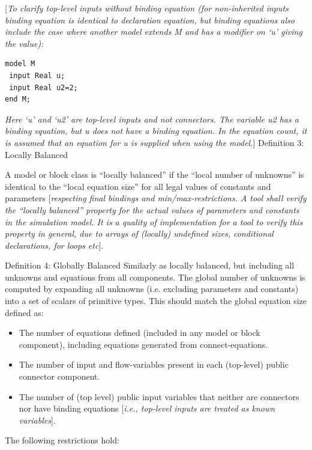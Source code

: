 \documentclass[10pt,a4paper]{report}
\def\Mcomment#1{{[}\emph{#1}{]}}
\def\Mcommentbegin#1{{[}\emph{#1}}
\def\Mcommentend#1{\emph{#1}{]}}
\begin{document}
\Mcommentbegin{To clarify top-level inputs without binding equation (for
non-inherited inputs binding equation is identical to declaration
equation, but binding equations also include the case where another
model extends M and has a modifier on `u' giving the value):}
\begin{lstlisting}[language=modelica]
model M
 input Real u;
 input Real u2=2;
end M;
\end{lstlisting}
\Mcommentend{Here `u' and `u2' are top-level inputs and not connectors. The
variable u2 has a binding equation, but u does not have a binding
equation. In the equation count, it is assumed that an equation for u is
supplied when using the model.}
{Definition 3: Locally Balanced}

A model or block class is ``locally balanced'' if the ``local number of
unknowns'' is identical to the ``local equation size'' for all legal
values of constants and parameters \Mcomment{respecting final bindings
and min/max-restrictions. A tool shall verify the ``locally balanced''
property for the actual values of parameters and constants in the
simulation model. It is a quality of implementation for a tool to verify
this property in general, due to arrays of (locally) undefined sizes,
conditional declarations, for loops etc}.

{Definition 4: Globally Balanced}
Similarly as locally balanced, but including all unknowns and equations
from all components. The global number of unknowns is computed by
expanding all unknowns (i.e. excluding parameters and constants) into a
set of scalars of primitive types. This should match the global equation
size defined as:

\begin{itemize}
\item
  The number of equations defined (included in any model or block
  component), including equations generated from connect-equations.
\item
  The number of input and flow-variables present in each (top-level)
  public connector component.
\item
  The number of (top level) public input variables that neither are
  connectors nor have binding equations \Mcomment{i.e., top-level inputs
  are treated as known variables}.
\end{itemize}

The following restrictions hold:
\end{document}
